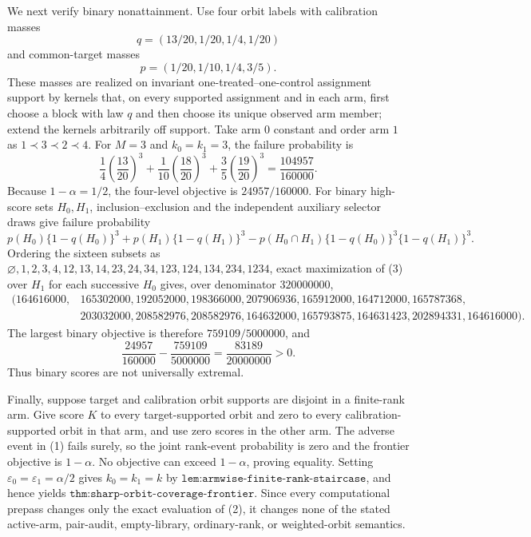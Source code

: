 We next verify binary nonattainment. Use four orbit labels with calibration masses
\[
q=(13/20,1/20,1/4,1/20)
\]
and common-target masses
\[
p=(1/20,1/10,1/4,3/5).
\]
These masses are realized on invariant one-treated--one-control assignment support by kernels that, on every supported assignment and in each arm, first choose a block with law \(q\) and then choose its unique observed arm member; extend the kernels arbitrarily off support. Take arm \(0\) constant and order arm \(1\) as \(1\prec3\prec2\prec4\). For \(M=3\) and \(k_0=k_1=3\), the failure probability is
\[
\frac14\left(\frac{13}{20}\right)^3
+\frac1{10}\left(\frac{18}{20}\right)^3
+\frac35\left(\frac{19}{20}\right)^3
=\frac{104957}{160000}.
\]
Because \(1-\alpha=1/2\), the four-level objective is \(24957/160000\). For binary high-score sets \(H_0,H_1\), inclusion--exclusion and the independent auxiliary selector draws give failure probability
\[
p(H_0)\{1-q(H_0)\}^3+p(H_1)\{1-q(H_1)\}^3
-p(H_0\cap H_1)\{1-q(H_0)\}^3\{1-q(H_1)\}^3.
\tag{3}
\]
Ordering the sixteen subsets as \(\varnothing,1,2,3,4,12,13,14,23,24,34,123,124,134,234,1234\), exact maximization of (3) over \(H_1\) for each successive \(H_0\) gives, over denominator \(320000000\),
\[
\begin{split}
(164616000,&165302000,192052000,198366000,207906936,165912000,164712000,165787368,\\
&203032000,208582976,208582976,164632000,165793875,164631423,202894331,164616000).
\end{split}
\]
The largest binary objective is therefore \(759109/5000000\), and
\[
\frac{24957}{160000}-\frac{759109}{5000000}
=\frac{83189}{20000000}>0.
\]
Thus binary scores are not universally extremal.

Finally, suppose target and calibration orbit supports are disjoint in a finite-rank arm. Give score \(K\) to every target-supported orbit and zero to every calibration-supported orbit in that arm, and use zero scores in the other arm. The adverse event in (1) fails surely, so the joint rank-event probability is zero and the frontier objective is \(1-\alpha\). No objective can exceed \(1-\alpha\), proving equality. Setting \(\varepsilon_0=\varepsilon_1=\alpha/2\) gives \(k_0=k_1=k\) by \(\texttt{lem:armwise-finite-rank-staircase}\), and hence yields \(\texttt{thm:sharp-orbit-coverage-frontier}\). Since every computational prepass changes only the exact evaluation of (2), it changes none of the stated active-arm, pair-audit, empty-library, ordinary-rank, or weighted-orbit semantics.